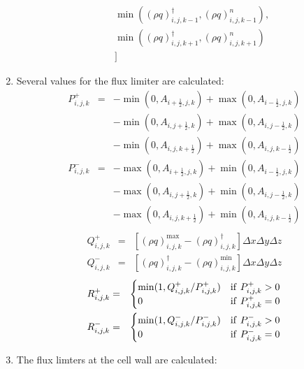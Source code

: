 \begin{enumerate}
\begin{eqnarray}
&&\min( \left(\rho q\right)^{\dagger}_{i,j,k-1},\left(\rho q\right)^{n}_{i,j,k-1} ),\nonumber\\
&&\min( \left(\rho q\right)^{\dagger}_{i,j,k+1},\left(\rho q\right)^{n}_{i,j,k+1} ) \nonumber\\
&&]
\end{eqnarray}
\item Several values for the flux limiter are calculated:
\begin{eqnarray}
P_{i,j,k}^{+} &=& 
-\min ( 0, A_{i+\frac{1}{2},j,k} ) + \max( 0, A_{i-\frac{1}{2},j,k} )\nonumber\\
&&
-\min ( 0, A_{i,j+\frac{1}{2},k} ) + \max( 0, A_{i,j-\frac{1}{2},k} )\nonumber\\
&&
-\min ( 0, A_{i,j,k+\frac{1}{2}} ) + \max( 0, A_{i,j,k-\frac{1}{2}} )\\
P_{i,j,k}^{-} &=& 
-\max ( 0, A_{i+\frac{1}{2},j,k} ) + \min( 0, A_{i-\frac{1}{2},j,k} )\nonumber\\
&&
-\max ( 0, A_{i,j+\frac{1}{2},k} ) + \min( 0, A_{i,j-\frac{1}{2},k} )\nonumber\\
&&
-\max ( 0, A_{i,j,k+\frac{1}{2}} ) + \min( 0, A_{i,j,k-\frac{1}{2}} )\\
\end{eqnarray}
\begin{eqnarray}
Q_{i,j,k}^{+} &=& 
\left[\left(\rho q\right)^{\max}_{i,j,k} - \left(\rho q\right)^{\dagger}_{i,j,k} \right]
\Delta x \Delta y \Delta z\\
Q_{i,j,k}^{-} &=& 
\left[\left(\rho q\right)^{\dagger}_{i,j,k}-\left(\rho q\right)^{\min}_{i,j,k} \right]
\Delta x \Delta y \Delta z
\end{eqnarray}
\begin{eqnarray}
R_{i,j,k}^{+} &=& 
\begin{cases}
        \min( 1, Q_{i,j,k}^{+}/P_{i,j,k}^{+} ) & {\rm if~} P_{i,j,k}^{+}>0\\
        0 & {\rm if~} P_{i,j,k}^{+}=0\\
\end{cases}
\\
R_{i,j,k}^{-} &=& 
\begin{cases}
        \min( 1, Q_{i,j,k}^{-}/P_{i,j,k}^{-} ) & {\rm if~} P_{i,j,k}^{-}>0\\
        0 & {\rm if~} P_{i,j,k}^{-}=0\\
\end{cases}
\end{eqnarray}
\item The flux limters at the cell wall are calculated:

\end{enumerate}
